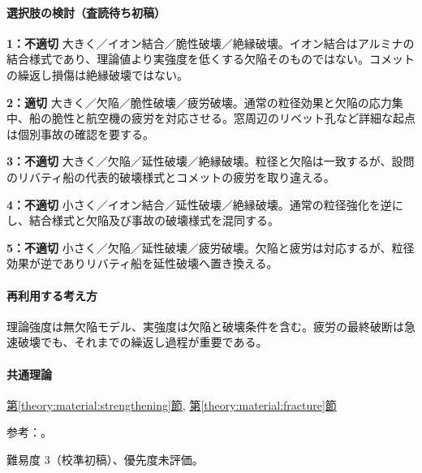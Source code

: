 \paragraph{選択肢の検討（査読待ち初稿）}\mbox{}\par

\noindent\textbf{1：不適切} 大きく／イオン結合／脆性破壊／絶縁破壊。イオン結合はアルミナの結合様式であり、理論値より実強度を低くする欠陥そのものではない。コメットの繰返し損傷は絶縁破壊ではない。\par

\noindent\textbf{2：適切} 大きく／欠陥／脆性破壊／疲労破壊。通常の粒径効果と欠陥の応力集中、船の脆性と航空機の疲労を対応させる。窓周辺のリベット孔など詳細な起点は個別事故の確認を要する。\par

\noindent\textbf{3：不適切} 大きく／欠陥／延性破壊／絶縁破壊。粒径と欠陥は一致するが、設問のリバティ船の代表的破壊様式とコメットの疲労を取り違える。\par

\noindent\textbf{4：不適切} 小さく／イオン結合／延性破壊／絶縁破壊。通常の粒径強化を逆にし、結合様式と欠陥及び事故の破壊様式を混同する。\par

\noindent\textbf{5：不適切} 小さく／欠陥／延性破壊／疲労破壊。欠陥と疲労は対応するが、粒径効果が逆でありリバティ船を延性破壊へ置き換える。\par

\paragraph{再利用する考え方} 理論強度は無欠陥モデル、実強度は欠陥と破壊条件を含む。疲労の最終破断は急速破壊でも、それまでの繰返し過程が重要である。

\paragraph{共通理論} \hyperref[theory:material:strengthening]{第\ref*{theory:material:strengthening}節}, \hyperref[theory:material:fracture]{第\ref*{theory:material:fracture}節}

\par 参考：\cite{mit_material_dislocations2001,mit_material_fracture2001,mit_material_fatigue2001,nist_fracture_history2010}。

\par 難易度 3（校準初稿）、優先度未評価。

